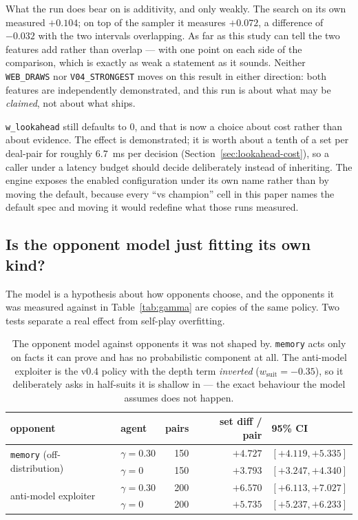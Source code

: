 \documentclass[11pt,a4paper]{article}
\begin{document}
What the run does bear on is additivity, and only weakly. The search on its own
measured $+0.104$; on top of the sampler it measures $+0.072$, a difference of
$-0.032$ with the two intervals overlapping. As far as this study can tell the
two features add rather than overlap --- with one point on each side of the
comparison, which is exactly as weak a statement as it sounds. Neither
\texttt{WEB\_DRAWS} nor \texttt{V04\_STRONGEST} moves on this result in either
direction: both features are independently demonstrated, and this run is about
what may be \emph{claimed}, not about what ships.

\texttt{w\_lookahead} still defaults to $0$, and that is now a choice about cost
rather than about evidence. The effect is demonstrated; it is worth about a tenth
of a set per deal-pair for roughly $6.7$~ms per decision
(Section~\ref{sec:lookahead-cost}), so a caller under a latency budget should
decide deliberately instead of inheriting. The engine exposes the enabled
configuration under its own name rather than by moving the default, because every
``vs champion'' cell in this paper names the default spec and moving it would
redefine what those runs measured.

\subsection{Is the opponent model just fitting its own kind?}
\label{sec:res-robust}

The model is a hypothesis about how opponents choose, and the opponents it was
measured against in Table~\ref{tab:gamma} are copies of the same policy. Two
tests separate a real effect from self-play overfitting.

\begin{table}[t]
\centering
\small
\begin{tabular}{llrrl}
\toprule
opponent & agent & pairs & set diff / pair & 95\% CI \\
\midrule
\multirow{2}{*}{\texttt{memory} (off-distribution)}
  & $\gamma = 0.30$ & 150 & $+4.727$ & $[+4.119, +5.335]$ \\
  & $\gamma = 0$    & 150 & $+3.793$ & $[+3.247, +4.340]$ \\
\midrule
\multirow{2}{*}{anti-model exploiter}
  & $\gamma = 0.30$ & 200 & $+6.570$ & $[+6.113, +7.027]$ \\
  & $\gamma = 0$    & 200 & $+5.735$ & $[+5.237, +6.233]$ \\
\bottomrule
\end{tabular}
\caption{The opponent model against opponents it was not shaped by.
\texttt{memory} acts only on facts it can prove and has no probabilistic
component at all. The anti-model exploiter is the v0.4 policy with the depth
term \emph{inverted} ($w_{\mathrm{suit}} = -0.35$), so it deliberately asks in
half-suits it is shallow in --- the exact behaviour the model assumes does not
happen.}
\label{tab:robust}
\end{table}
\end{document}
